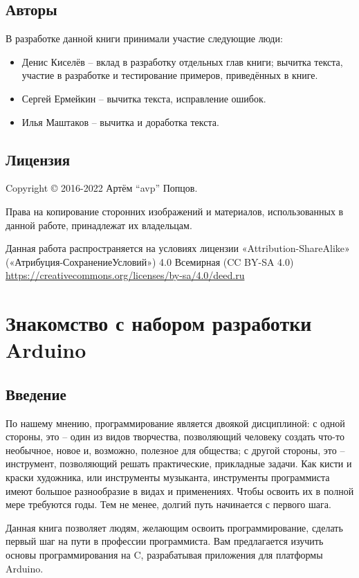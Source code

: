 \documentclass[a4paper,twoside]{book}
\begin{document}
\section{Авторы}
В разработке данной книги принимали участие следующие люди:
\begin{itemize}
\item Денис Киселёв -- вклад в разработку отдельных глав книги; вычитка текста,
  участие в разработке и тестирование примеров, приведённых в книге.
\item Сергей Ермейкин -- вычитка текста, исправление ошибок.
\item Илья Маштаков – вычитка и доработка текста.
\end{itemize}

\section{Лицензия}
Copyright © 2016-2022 Артём ``avp'' Попцов.

Права на копирование сторонних изображений и материалов, использованных в данной
работе, принадлежат их владельцам.

Данная работа распространяется на условиях лицензии «Attribution-ShareAlike»
(«Атрибуция-СохранениеУсловий») 4.0 Всемирная (CC BY-SA 4.0)
\url{https://creativecommons.org/licenses/by-sa/4.0/deed.ru}

\chapter{Знакомство с набором разработки Arduino}

\section{Введение}
По нашему мнению, программирование является двоякой дисциплиной: с одной
стороны, это – один из видов творчества, позволяющий человеку создать что-то
необычное, новое и, возможно, полезное для общества; с другой стороны, это –
инструмент, позволяющий решать практические, прикладные задачи. Как кисти и
краски художника, или инструменты музыканта, инструменты программиста имеют
большое разнообразие в видах и применениях. Чтобы освоить их в полной мере
требуются годы. Тем не менее, долгий путь начинается с первого шага.

Данная книга позволяет людям, желающим освоить программирование, сделать первый
шаг на пути в профессии программиста. Вам предлагается изучить основы
программирования на C, разрабатывая приложения для платформы Arduino.
\end{document}
